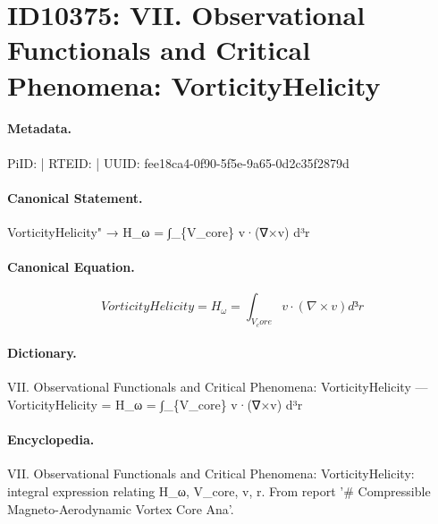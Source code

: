 \section*{ID10375: VII. Observational Functionals and Critical Phenomena: VorticityHelicity}
\paragraph{Metadata.}
PiID:  | RTEID:  | UUID: fee18ca4-0f90-5f5e-9a65-0d2c35f2879d

\paragraph{Canonical Statement.}
VorticityHelicity" → H\_ω = ∫\_\{V\_core\} v·(∇×v) d³r

\paragraph{Canonical Equation.}
\[
VorticityHelicity = H_ω = ∫_{V_core} v·(∇×v) d³r
\]

\paragraph{Dictionary.}
VII. Observational Functionals and Critical Phenomena: VorticityHelicity — VorticityHelicity = H\_ω = ∫\_\{V\_core\} v·(∇×v) d³r

\paragraph{Encyclopedia.}
VII. Observational Functionals and Critical Phenomena: VorticityHelicity: integral expression relating H\_ω, V\_core, v, r. From report '\# Compressible Magneto-Aerodynamic Vortex Core Ana'.
